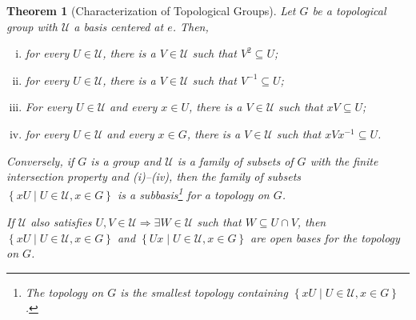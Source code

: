 \documentclass[10pt]{extarticle}
\newcommand{\set}[1]{\left\{#1\right\}}
\theoremstyle{plain}
\newtheorem*{theorem}{Theorem}
\theoremstyle{definition}
\theoremstyle{note}
\renewcommand{\newline}{\hfill\break}
\begin{document}
\begin{theorem}[Characterization of Topological Groups]
  Let $G$ be a topological group with $\mathcal{U}$ a basis centered at $e$. Then,
  \begin{enumerate}[(i)]
    \item for every $U\in \mathcal{U}$, there is a $V\in \mathcal{U}$ such that $V^{2} \subseteq U$;
    \item for every $U\in \mathcal{U}$, there is a $V\in \mathcal{U}$ such that $V^{-1}\subseteq U$;
    \item For every $U\in \mathcal{U}$ and every $x\in U$, there is a $V\in \mathcal{U}$ such that $xV \subseteq U$;
    \item for every $U\in \mathcal{U}$ and every $x\in G$, there is a $V\in \mathcal{U}$ such that $xVx^{-1}\subseteq U$.
  \end{enumerate}
  Conversely, if $G$ is a group and $\mathcal{U}$ is a family of subsets of $G$ with the finite intersection property and (i)--(iv), then the family of subsets $\set{xU\mid U\in \mathcal{U},x\in G}$ is a subbasis\footnote{The topology on $G$ is the smallest topology containing $\set{xU\mid U\in \mathcal{U},x\in G}$.} for a topology on $G$.\newline

  If $\mathcal{U}$ also satisfies $U,V\in \mathcal{U}\Rightarrow \exists W\in \mathcal{U}$ such that $W\subseteq U\cap V$, then $\set{xU\mid U\in \mathcal{U},x\in G}$ and $\set{Ux\mid U\in \mathcal{U},x\in G}$ are open bases for the topology on $G$.
\end{theorem}
\end{document}
